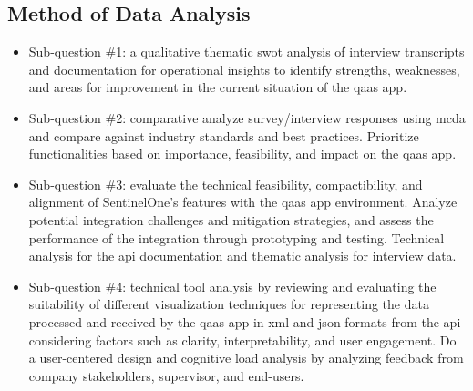 \begin{multicols}{2}
      \subsection{Method of Data Analysis}
      \begin{itemize}[label=-]
            \item Sub-question \#1: a qualitative thematic \acrshort{swot} analysis of interview transcripts
                  and documentation for operational insights to identify strengths, weaknesses, and areas for
                  improvement in the current situation of the \acrshort{qaas} app.
            \item Sub-question \#2: comparative analyze survey/interview responses using \acrshort{mcda} and
                  compare against industry standards and best practices. Prioritize functionalities based on
                  importance, feasibility, and impact on the \acrshort{qaas} app.
            \item Sub-question \#3: evaluate the technical feasibility, compactibility, and alignment of
                  SentinelOne's features with the \acrshort{qaas} app environment. Analyze potential integration
                  challenges and mitigation strategies, and assess the performance of the integration through
                  prototyping and testing. Technical analysis for the \acrshort{api} documentation and
                  thematic analysis for interview data.
            \item Sub-question \#4: technical tool analysis by reviewing and evaluating the suitability of different
                  visualization techniques for representing the data processed and received by the \acrshort{qaas}
                  app in \acrshort{xml} and \acrshort{json} formats from the \acrshort{api} considering factors such
                  as clarity, interpretability, and user engagement. Do a user-centered design and cognitive load
                  analysis by analyzing feedback from company stakeholders, supervisor, and end-users.
      \end{itemize}

\end{multicols}
